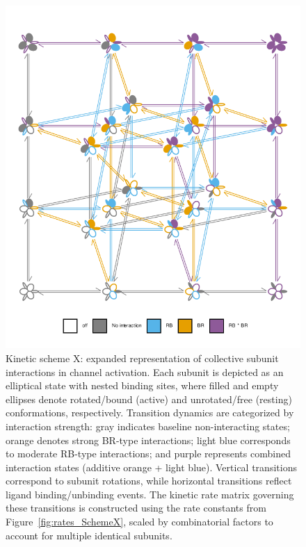 \documentclass[pdflatex,sn-nature]{sn-jnl}%
\theoremstyle{thmstyleone}%
\theoremstyle{thmstyletwo}%
\theoremstyle{thmstylethree}%
\begin{document}
\begin{figure}[!htbp]
	\centering
	\includegraphics[width=\linewidth]{Figure_4_m.pdf}
	\caption{Kinetic scheme X: expanded representation of collective subunit interactions in channel activation. Each subunit is depicted as an elliptical state with nested binding sites, where filled and empty ellipses denote rotated/bound (active) and unrotated/free (resting) conformations, respectively. Transition dynamics are categorized by interaction strength: gray indicates baseline non-interacting states; orange denotes strong BR-type interactions; light blue corresponds to moderate RB-type interactions; and purple represents combined interaction states (additive orange + light blue). Vertical transitions correspond to subunit rotations, while horizontal transitions reflect ligand binding/unbinding events. The kinetic rate matrix governing these transitions is constructed using the rate constants from Figure~\ref{fig:rates_SchemeX}, scaled by combinatorial factors to account for multiple identical subunits.}
	
	\label{fig:SchemeX_full}
\end{figure}
\end{document}
